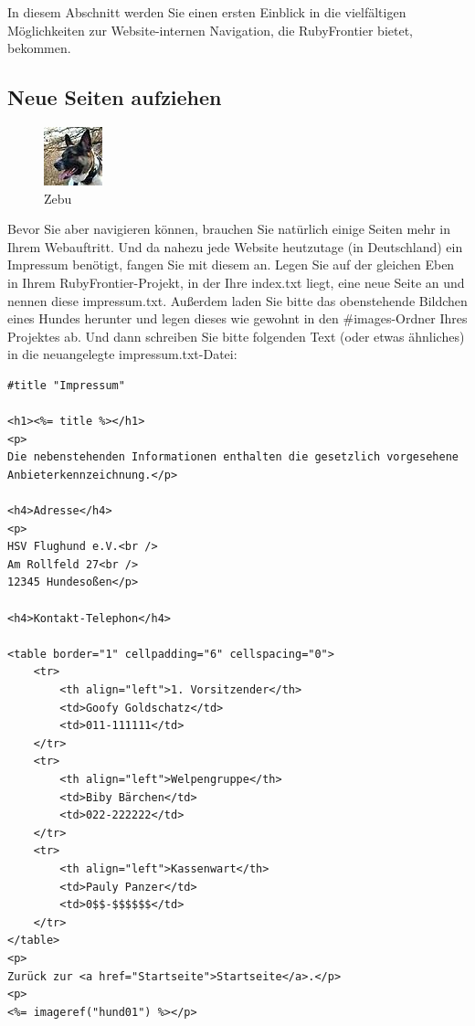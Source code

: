\documentclass[11pt]{report}
\begin{document}
In diesem Abschnitt werden Sie einen ersten Einblick in die
vielfältigen Möglichkeiten zur Website-internen Navigation, die
RubyFrontier bietet, bekommen.
\subsection{Neue Seiten aufziehen}
\label{sec-2-1-2-1}


\begin{figure}[h!]
\centering
\includegraphics[width 2cm]{./images/hund01.jpg}
\caption{\label{hund01}Zebu}
\end{figure}


Bevor Sie aber navigieren können, brauchen Sie natürlich einige Seiten
mehr in Ihrem Webauftritt. Und da nahezu jede Website heutzutage (in
Deutschland) ein Impressum benötigt, fangen Sie mit diesem an. Legen
Sie auf der gleichen Eben in Ihrem RubyFrontier-Projekt, in der Ihre
index.txt liegt, eine neue Seite an und nennen diese
impressum.txt. Außerdem laden Sie bitte das obenstehende Bildchen
eines Hundes herunter und legen dieses wie gewohnt in
den \#images-Ordner Ihres Projektes ab. Und dann schreiben Sie bitte
folgenden Text (oder etwas ähnliches) in die neuangelegte
impressum.txt-Datei:


\begin{verbatim}
#title "Impressum"

<h1><%= title %></h1>
<p>
Die nebenstehenden Informationen enthalten die gesetzlich vorgesehene
Anbieterkennzeichnung.</p>

<h4>Adresse</h4>
<p>
HSV Flughund e.V.<br />
Am Rollfeld 27<br />
12345 Hundesoßen</p>

<h4>Kontakt-Telephon</h4>

<table border="1" cellpadding="6" cellspacing="0">
    <tr>
        <th align="left">1. Vorsitzender</th>
        <td>Goofy Goldschatz</td>
        <td>011-111111</td>
    </tr>
    <tr>
        <th align="left">Welpengruppe</th>
        <td>Biby Bärchen</td>
        <td>022-222222</td>
    </tr>
    <tr>
        <th align="left">Kassenwart</th>
        <td>Pauly Panzer</td>
        <td>0$$-$$$$$$</td>
    </tr>
</table>
<p>
Zurück zur <a href="Startseite">Startseite</a>.</p>
<p>
<%= imageref("hund01") %></p>
\end{verbatim}
\end{document}
